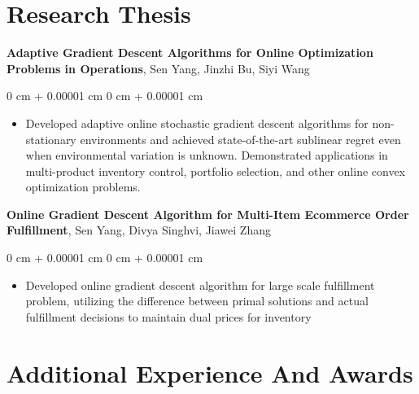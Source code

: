 \documentclass[10pt, letterpaper]{article}
\newenvironment{highlights}{
    \begin{itemize}[
        topsep=0.10 cm,
        parsep=0.10 cm,
        partopsep=0pt,
        itemsep=0pt,
        leftmargin=0 cm + 10pt
    ]
}{
    \end{itemize}
} %
\newenvironment{onecolentry}{
    \begin{adjustwidth}{
        0 cm + 0.00001 cm
    }{
        0 cm + 0.00001 cm
    }
}{
    \end{adjustwidth}
} %
\begin{document}
    \section{Research Thesis} 
        

        \textbf{Adaptive Gradient Descent Algorithms for Online Optimization Problems in Operations}, Sen Yang, Jinzhi Bu, Siyi Wang

        \vspace{0.10 cm}
        \begin{onecolentry}
            \begin{highlights}
                \item Developed adaptive online stochastic gradient descent algorithms for non-stationary environments and achieved state-of-the-art sublinear regret even when environmental variation is unknown. Demonstrated applications in multi-product inventory control, portfolio selection, and other online convex optimization problems.
            \end{highlights}
        \end{onecolentry}


        \vspace{0.2 cm}
            \textbf{Online Gradient Descent Algorithm for Multi-Item Ecommerce Order Fulfillment}, Sen Yang, Divya Singhvi, Jiawei Zhang

        \vspace{0.10 cm}
        \begin{onecolentry}
            \begin{highlights}
                \item Developed online gradient descent algorithm for large scale fulfillment problem, utilizing the difference between primal solutions and actual fulfillment decisions to maintain dual prices for inventory
            \end{highlights}
        \end{onecolentry}


    



    
  





    
    \section{Additional Experience And Awards}
\end{document}

